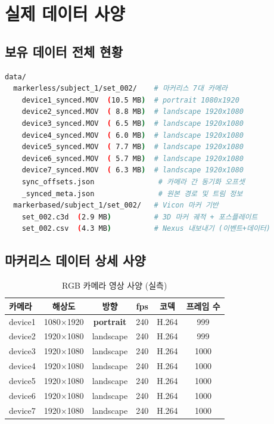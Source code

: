 \documentclass[11pt, a4paper]{report}
\begin{document}
\tableofcontents
\newpage


\chapter{실제 데이터 사양}
\label{ch:data_spec}

\section{보유 데이터 전체 현황}

\begin{databox}[title={데이터 위치: \texttt{data/}}]
\begin{lstlisting}[language=bash, numbers=none]
data/
  markerless/subject_1/set_002/    # 마커리스 7대 카메라
    device1_synced.MOV  (10.5 MB)  # portrait 1080x1920
    device2_synced.MOV  ( 8.8 MB)  # landscape 1920x1080
    device3_synced.MOV  ( 6.5 MB)  # landscape 1920x1080
    device4_synced.MOV  ( 6.0 MB)  # landscape 1920x1080
    device5_synced.MOV  ( 7.7 MB)  # landscape 1920x1080
    device6_synced.MOV  ( 5.7 MB)  # landscape 1920x1080
    device7_synced.MOV  ( 6.3 MB)  # landscape 1920x1080
    sync_offsets.json               # 카메라 간 동기화 오프셋
    _synced_meta.json               # 원본 경로 및 트림 정보
  markerbased/subject_1/set_002/   # Vicon 마커 기반
    set_002.c3d  (2.9 MB)          # 3D 마커 궤적 + 포스플레이트
    set_002.csv  (4.3 MB)          # Nexus 내보내기 (이벤트+데이터)
\end{lstlisting}
\end{databox}


\section{마커리스 데이터 상세 사양}

\begin{table}[H]
\centering
\caption{RGB 카메라 영상 사양 (실측)}
\label{tab:rgb_spec}
\renewcommand{\arraystretch}{1.3}
\begin{tabular}{lccccc}
\toprule
\textbf{카메라} & \textbf{해상도} & \textbf{방향} & \textbf{fps} & \textbf{코덱} & \textbf{프레임 수} \\
\midrule
device1 & 1080$\times$1920 & \textbf{portrait} & 240 & H.264 & 999 \\
device2 & 1920$\times$1080 & landscape & 240 & H.264 & 999 \\
device3 & 1920$\times$1080 & landscape & 240 & H.264 & 1000 \\
device4 & 1920$\times$1080 & landscape & 240 & H.264 & 1000 \\
device5 & 1920$\times$1080 & landscape & 240 & H.264 & 1000 \\
device6 & 1920$\times$1080 & landscape & 240 & H.264 & 1000 \\
device7 & 1920$\times$1080 & landscape & 240 & H.264 & 1000 \\
\bottomrule
\end{tabular}
\end{table}
\end{document}
